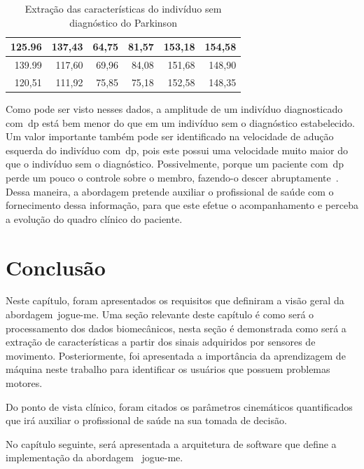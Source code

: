 \begin{table}[h]
\begin{tabular}{|r|r|r|r|r|r|}
125.96                                                                                   & 137,43                                                                                   & 64,75                                                              & 81,57                                                             & 153,18            & 154,58             \\ \hline
139.99                                                                                   & 117,60                                                                                   & 69,96                                                              & 84,08                                                             & 151,68            & 148,90             \\ \hline
120,51                                                                                   & 111,92                                                                                   & 75,85                                                              & 75,18                                                             & 152,58            & 148,35             \\ \hline
\end{tabular}
\caption{Extração das características do indivíduo sem diagnóstico do Parkinson}
\label{table:extracao_caracterisca_saudavel}
\end{table}

Como pode ser visto nesses dados, a amplitude de um indivíduo diagnosticado com~\ac{dp} está bem menor do que em um indivíduo sem o diagnóstico estabelecido. Um valor importante também pode ser identificado na velocidade de adução esquerda do indivíduo com~\ac{dp}, pois este possui uma velocidade muito maior do que o indivíduo sem o diagnóstico. Possivelmente, porque um paciente com~\ac{dp} perde um pouco o controle sobre o membro, fazendo-o descer abruptamente~\cite{protpar010}. Dessa maneira, a abordagem pretende auxiliar o profissional de saúde com o fornecimento dessa informação, para que este efetue o acompanhamento e perceba a evolução do quadro clínico do paciente.

\section{Conclusão}
Neste capítulo, foram apresentados os requisitos que definiram a visão geral da abordagem~\ac{jogue-me}. Uma seção relevante deste capítulo é como será o processamento dos dados biomecânicos, nesta seção é demonstrada como será a extração de características a partir dos sinais adquiridos por sensores de movimento. Posteriormente, foi apresentada a importância da aprendizagem de máquina neste trabalho para identificar os usuários que possuem problemas motores.

Do ponto de vista clínico, foram citados os parâmetros cinemáticos quantificados que irá auxiliar o profissional de saúde na sua tomada de decisão. 

No capítulo seguinte, será apresentada a arquitetura de software que define a implementação da abordagem ~\ac{jogue-me}.